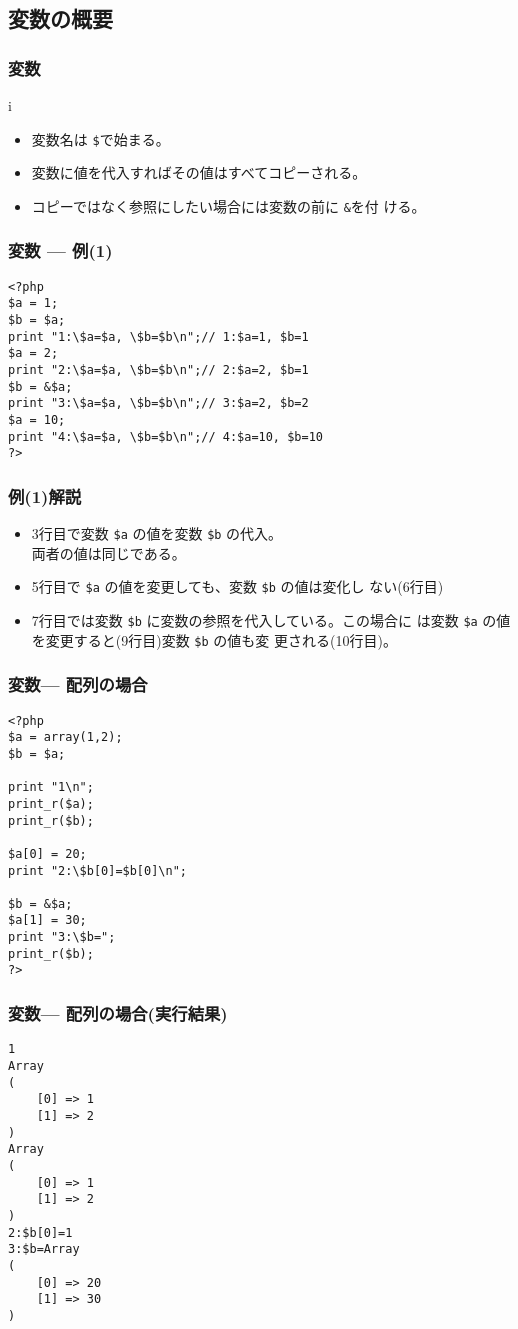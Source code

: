 \documentclass[dvipsk]{beamer}
\begin{document}
\subsection{変数の概要}
\begin{frame}[containsverbatim]
\frametitle{変数}
i\begin{itemize}
  \item 変数名は \texttt{\$}で始まる。
  \item 変数に値を代入すればその値はすべてコピーされる。
  \item コピーではなく参照にしたい場合には変数の前に \texttt{\&}を付
ける。
 \end{itemize}
\end{frame}
\begin{frame}[containsverbatim]
\frametitle{変数 --- 例(1)}
\begin{verbatim}
<?php
$a = 1;
$b = $a;
print "1:\$a=$a, \$b=$b\n";// 1:$a=1, $b=1
$a = 2;
print "2:\$a=$a, \$b=$b\n";// 2:$a=2, $b=1
$b = &$a;
print "3:\$a=$a, \$b=$b\n";// 3:$a=2, $b=2
$a = 10;
print "4:\$a=$a, \$b=$b\n";// 4:$a=10, $b=10
?>
\end{verbatim}
\end{frame}
\begin{frame}[containsverbatim]
 \frametitle{例(1)解説}
 \begin{itemize}
  \item 3行目で変数 \verb+$a+ の値を変数 \verb+$b+ の代入。\\
        両者の値は同じである。
  \item 5行目で \verb+$a+ の値を変更しても、変数 \verb+$b+ の値は変化し
        ない(6行目)
  \item 7行目では変数 \verb+$b+ に変数の参照を代入している。この場合に
        は変数 \verb+$a+ の値を変更すると(9行目)変数 \verb+$b+ の値も変
        更される(10行目)。
 \end{itemize}
\end{frame}
\begin{frame}[containsverbatim]
 \frametitle{変数--- 配列の場合}

\begin{verbatim}
<?php
$a = array(1,2);
$b = $a;

print "1\n";
print_r($a);
print_r($b);

$a[0] = 20;
print "2:\$b[0]=$b[0]\n";

$b = &$a;
$a[1] = 30;
print "3:\$b=";
print_r($b);
?>
\end{verbatim}
\end{frame}
\begin{frame}[containsverbatim]
 \frametitle{変数--- 配列の場合(実行結果)}
 {\small
\begin{verbatim}
1
Array
(
    [0] => 1
    [1] => 2
)
Array
(
    [0] => 1
    [1] => 2
)
2:$b[0]=1
3:$b=Array
(
    [0] => 20
    [1] => 30
)
\end{verbatim}
 }
\end{frame}
\end{document}
